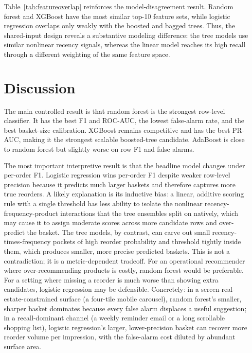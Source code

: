 \documentclass[10pt,twocolumn]{article}
\begin{document}
Table~\ref{tab:featureoverlap} reinforces the model-disagreement result. Random forest and XGBoost have the most similar top-10 feature sets, while logistic regression overlaps only weakly with the boosted and bagged trees. Thus, the shared-input design reveals a substantive modeling difference: the tree models use similar nonlinear recency signals, whereas the linear model reaches its high recall through a different weighting of the same feature space.

\section{Discussion}

The main controlled result is that random forest is the strongest row-level classifier. It has the best F1 and ROC-AUC, the lowest false-alarm rate, and the best basket-size calibration. XGBoost remains competitive and has the best PR-AUC, making it the strongest scalable boosted-tree candidate. AdaBoost is close to random forest but slightly worse on row F1 and false alarms.

The most important interpretive result is that the headline model changes under per-order F1. Logistic regression wins per-order F1 despite weaker row-level precision because it predicts much larger baskets and therefore captures more true reorders. A likely explanation is its inductive bias: a linear, additive scoring rule with a single threshold has less ability to isolate the nonlinear recency-frequency-product interactions that the tree ensembles split on natively, which may cause it to assign moderate scores across more candidate rows and over-predict the basket. The tree models, by contrast, can carve out small recency-times-frequency pockets of high reorder probability and threshold tightly inside them, which produces smaller, more precise predicted baskets. This is not a contradiction; it is a metric-dependent tradeoff. For an operational recommender where over-recommending products is costly, random forest would be preferable. For a setting where missing a reorder is much worse than showing extra candidates, logistic regression may be defensible. Concretely: in a screen-real-estate-constrained surface (a four-tile mobile carousel), random forest's smaller, sharper basket dominates because every false alarm displaces a useful suggestion; in a recall-dominant channel (a weekly reminder email or a long scrollable shopping list), logistic regression's larger, lower-precision basket can recover more reorder volume per impression, with the false-alarm cost diluted by abundant surface area.
\end{document}
